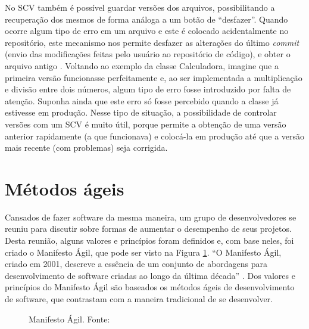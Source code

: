 No SCV também é possível guardar versões dos arquivos, possibilitando a recuperação dos mesmos de forma análoga a um botão de ``desfazer''. Quando ocorre algum tipo de erro em um arquivo e este é colocado acidentalmente no repositório, este mecanismo nos permite desfazer as alterações do último \textit{commit} (envio das modificações feitas pelo usuário ao repositório de código), e obter o arquivo antigo \cite{SHORE}. Voltando ao exemplo da classe Calculadora, imagine que a primeira versão funcionasse perfeitamente e, ao ser implementada a multiplicação e divisão entre dois números, algum tipo de erro fosse introduzido por falta de atenção. Suponha ainda que este erro só fosse percebido quando a classe já estivesse em produção. Nesse tipo de situação, a possibilidade de controlar versões com um SCV é muito útil, porque permite a obtenção de uma versão anterior rapidamente (a que funcionava) e colocá-la em produção até que a versão mais recente (com problemas) seja corrigida.

\section{Métodos ágeis}

Cansados de fazer software da mesma maneira, um grupo de desenvolvedores se reuniu para discutir sobre formas de aumentar o desempenho de seus projetos. Desta reunião, alguns valores e princípios foram definidos e, com base neles, foi criado o Manifesto Ágil, que pode ser visto na Figura \ref{manifesto_agil}. ``O Manifesto Ágil, criado em 2001, descreve a essência de um conjunto de abordagens para desenvolvimento de software criadas ao longo da última década'' \cite{IMPROVEIT-MANIFESTO}. Dos valores e princípios do Manifesto Ágil são baseados os métodos ágeis de desenvolvimento de software, que contrastam com a maneira tradicional de se desenvolver.

\begin{figure}[ht]
    \centering
    \caption{Manifesto Ágil. Fonte: \cite{SHORE}}
    \label{manifesto_agil}
\end{figure}

